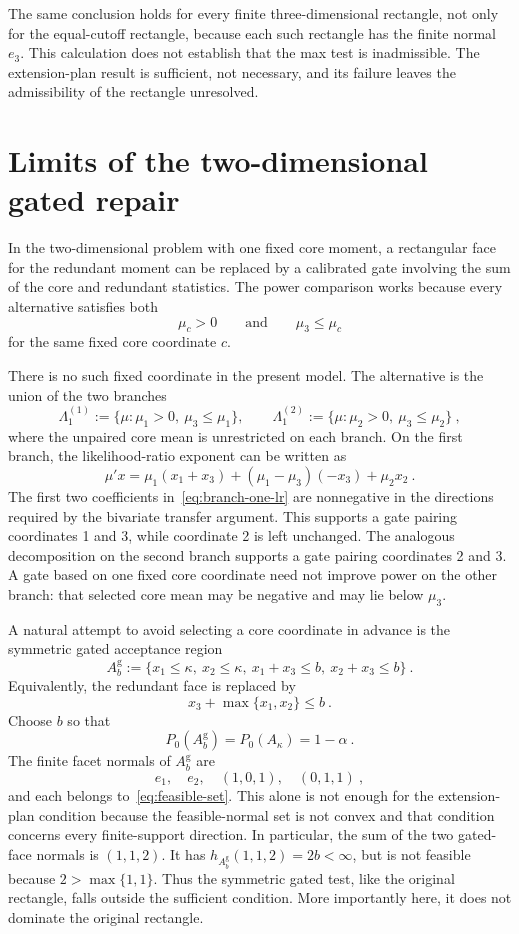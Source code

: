 \documentclass[12pt]{article}
\theoremstyle{remark}
\begin{document}
The same conclusion holds for every finite three-dimensional rectangle, not
only for the equal-cutoff rectangle, because each such rectangle has the
finite normal $e_3$.  This calculation does not establish that the max test is
inadmissible.  The extension-plan result is sufficient, not necessary, and
its failure leaves the admissibility of the rectangle unresolved.

\section{Limits of the two-dimensional gated repair}

In the two-dimensional problem with one fixed core moment, a rectangular face
for the redundant moment can be replaced by a calibrated gate involving the
sum of the core and redundant statistics.  The power comparison works because
every alternative satisfies both
\[
\mu_c>0
\qquad\text{and}\qquad
\mu_3\le\mu_c
\]
for the same fixed core coordinate $c$.

There is no such fixed coordinate in the present model.  The alternative is
the union of the two branches
\[
\Lambda_1^{(1)}
:=
\{\mu:\mu_1>0,\ \mu_3\le\mu_1\},
\qquad
\Lambda_1^{(2)}
:=
\{\mu:\mu_2>0,\ \mu_3\le\mu_2\}~,
\]
where the unpaired core mean is unrestricted on each branch.  On the first
branch, the likelihood-ratio exponent can be written as
\begin{equation}\label{eq:branch-one-lr}
\mu'x
=
\mu_1(x_1+x_3)
+(\mu_1-\mu_3)(-x_3)
+\mu_2x_2~.
\end{equation}
The first two coefficients in~\eqref{eq:branch-one-lr} are nonnegative in the
directions required by the bivariate transfer argument.  This supports a gate
pairing coordinates 1 and 3, while coordinate 2 is left unchanged.  The
analogous decomposition on the second branch supports a gate pairing
coordinates 2 and 3.  A gate based on one fixed core coordinate need not
improve power on the other branch: that selected core mean may be negative and
may lie below $\mu_3$.

A natural attempt to avoid selecting a core coordinate in advance is the
symmetric gated acceptance region
\begin{equation}\label{eq:symmetric-gate}
A_b^{\mathrm g}
:=
\{x_1\le\kappa,\ x_2\le\kappa,\
  x_1+x_3\le b,\ x_2+x_3\le b\}~.
\end{equation}
Equivalently, the redundant face is replaced by
\[
x_3+\max\{x_1,x_2\}\le b~.
\]
Choose $b$ so that
\[
P_0(A_b^{\mathrm g})=P_0(A_\kappa)=1-\alpha~.
\]
The finite facet normals of $A_b^{\mathrm g}$ are
\[
e_1,\quad e_2,\quad (1,0,1),\quad (0,1,1)~,
\]
and each belongs to~\eqref{eq:feasible-set}.  This alone is not enough for the
extension-plan condition because the feasible-normal set is not convex and
that condition concerns every finite-support direction.  In particular, the
sum of the two gated-face
normals is $(1,1,2)$.  It has
$h_{A_b^{\mathrm g}}(1,1,2)=2b<\infty$, but is not feasible because
$2>\max\{1,1\}$.  Thus the symmetric gated test, like the original rectangle,
falls outside the sufficient condition.  More importantly here, it does not
dominate the original rectangle.
\end{document}
